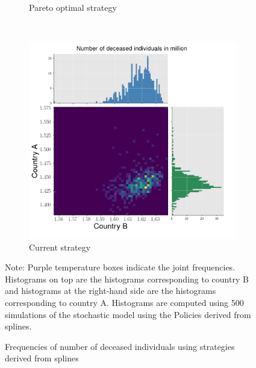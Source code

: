 \begin{figure}[h!]
\begin{subfigure}[b]{0.49\textwidth}
         \caption{Pareto optimal strategy}
         \label{fig:2d_optimal}
     \end{subfigure}
     \\
     \begin{subfigure}[b]{0.49\textwidth}
         \centering
         \includegraphics[width=\textwidth]{images/splines_stochastic_histogram_deceased_current.png}
         \caption{Current strategy}
         \label{fig:2d_current}
     \end{subfigure}
\begin{flushleft}
\scriptsize{Note:} Purple temperature boxes indicate the joint frequencies. Histograms on top are the histograms corresponding to country B and histograms at the right-hand side are the histograms corresponding to country A. Histograms are computed using 500 simulations of the stochastic model using the Policies derived from splines. 
\end{flushleft}
        \caption{Frequencies of number of deceased individuals using strategies derived from splines}
        \label{fig:histograms} 
\end{figure}

